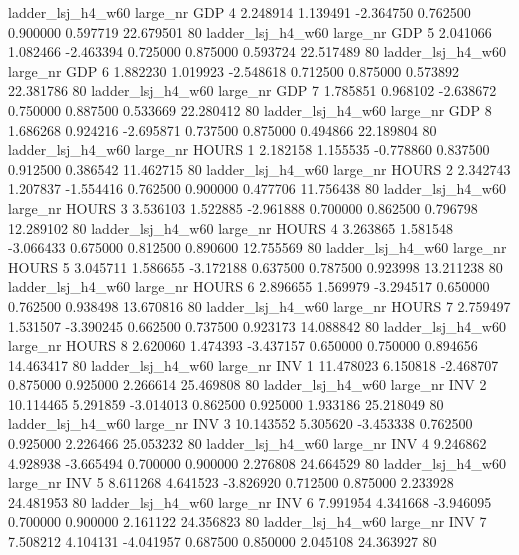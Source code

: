   ladder_lsj_h4_w60   large_nr      GDP                 4  2.248914  1.139491  -2.364750 0.762500 0.900000  0.597719   22.679501 80
  ladder_lsj_h4_w60   large_nr      GDP                 5  2.041066  1.082466  -2.463394 0.725000 0.875000  0.593724   22.517489 80
  ladder_lsj_h4_w60   large_nr      GDP                 6  1.882230  1.019923  -2.548618 0.712500 0.875000  0.573892   22.381786 80
  ladder_lsj_h4_w60   large_nr      GDP                 7  1.785851  0.968102  -2.638672 0.750000 0.887500  0.533669   22.280412 80
  ladder_lsj_h4_w60   large_nr      GDP                 8  1.686268  0.924216  -2.695871 0.737500 0.875000  0.494866   22.189804 80
  ladder_lsj_h4_w60   large_nr    HOURS                 1  2.182158  1.155535  -0.778860 0.837500 0.912500  0.386542   11.462715 80
  ladder_lsj_h4_w60   large_nr    HOURS                 2  2.342743  1.207837  -1.554416 0.762500 0.900000  0.477706   11.756438 80
  ladder_lsj_h4_w60   large_nr    HOURS                 3  3.536103  1.522885  -2.961888 0.700000 0.862500  0.796798   12.289102 80
  ladder_lsj_h4_w60   large_nr    HOURS                 4  3.263865  1.581548  -3.066433 0.675000 0.812500  0.890600   12.755569 80
  ladder_lsj_h4_w60   large_nr    HOURS                 5  3.045711  1.586655  -3.172188 0.637500 0.787500  0.923998   13.211238 80
  ladder_lsj_h4_w60   large_nr    HOURS                 6  2.896655  1.569979  -3.294517 0.650000 0.762500  0.938498   13.670816 80
  ladder_lsj_h4_w60   large_nr    HOURS                 7  2.759497  1.531507  -3.390245 0.662500 0.737500  0.923173   14.088842 80
  ladder_lsj_h4_w60   large_nr    HOURS                 8  2.620060  1.474393  -3.437157 0.650000 0.750000  0.894656   14.463417 80
  ladder_lsj_h4_w60   large_nr      INV                 1 11.478023  6.150818  -2.468707 0.875000 0.925000  2.266614   25.469808 80
  ladder_lsj_h4_w60   large_nr      INV                 2 10.114465  5.291859  -3.014013 0.862500 0.925000  1.933186   25.218049 80
  ladder_lsj_h4_w60   large_nr      INV                 3 10.143552  5.305620  -3.453338 0.762500 0.925000  2.226466   25.053232 80
  ladder_lsj_h4_w60   large_nr      INV                 4  9.246862  4.928938  -3.665494 0.700000 0.900000  2.276808   24.664529 80
  ladder_lsj_h4_w60   large_nr      INV                 5  8.611268  4.641523  -3.826920 0.712500 0.875000  2.233928   24.481953 80
  ladder_lsj_h4_w60   large_nr      INV                 6  7.991954  4.341668  -3.946095 0.700000 0.900000  2.161122   24.356823 80
  ladder_lsj_h4_w60   large_nr      INV                 7  7.508212  4.104131  -4.041957 0.687500 0.850000  2.045108   24.363927 80
